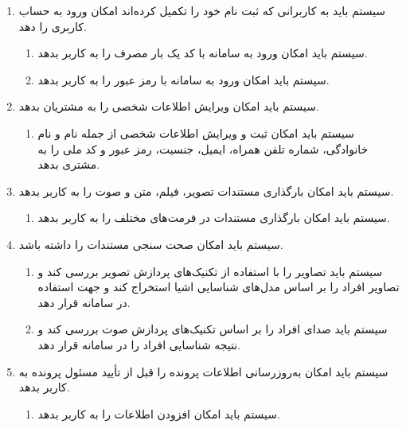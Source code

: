 \documentclass[12pt,a4paper,oneside]{article}
\begin{document}
\begin{itemize}
\begin{enumerate}
			\item 
			سیستم باید به کاربرانى که ثبت نام خود را تکمیل کرده‌اند امکان ورود به حساب کاربری را دهد.
			\begin{enumerate}
				\renewcommand{\labelenumii}{{\rl{\arabic{enumii}.\arabic{enumi}}}R-}
				\item 
				سیستم باید امکان ورود به سامانه با کد یک بار مصرف را به کاربر بدهد.
				\item 
				سیستم باید امکان ورود به سامانه با رمز عبور را به کاربر بدهد.
			\end{enumerate}
	
			\item 
			سیستم باید امکان ویرایش اطلاعات شخصى را به مشتریان بدهد.
			\begin{enumerate}
				\renewcommand{\labelenumii}{{\rl{\arabic{enumii}.\arabic{enumi}}}R-}
				\item 
				سیستم باید امکان ثبت و ویرایش اطلاعات شخصى از جمله نام و نام خانوادگی، شماره تلفن همراه، ایمیل، جنسیت، رمز عبور و کد ملى را به مشتری بدهد.
			\end{enumerate}
	
			\item 
			سیستم باید امکان بارگذاری مستندات تصویر، فیلم، متن و صوت را به کاربر بدهد.
			\begin{enumerate}
				\renewcommand{\labelenumii}{{\rl{\arabic{enumii}.\arabic{enumi}}}R-}
				\item 
				سیستم باید امکان بارگذاری مستندات در فرمت‌های مختلف را به کاربر بدهد.
			\end{enumerate}
	
			\item 
			سیستم باید امکان صحت سنجی مستندات را داشته باشد.
			\begin{enumerate}
				\renewcommand{\labelenumii}{{\rl{\arabic{enumii}.\arabic{enumi}}}R-}
				\item 
				سیستم باید تصاویر را با استفاده از تکنیک‌های پردازش تصویر بررسی کند و تصاویر افراد را بر اساس مدل‌های شناسایی اشیا استخراج کند و جهت استفاده در سامانه قرار دهد.
				\item 
				سیستم باید صدای افراد را بر اساس تکنیک‌های پردازش صوت بررسی کند و نتیجه شناسایی افراد را در سامانه قرار دهد.
			\end{enumerate}
	
			\item 
			سیستم باید امکان به‌روزرسانی اطلاعات پرونده را قبل از تأیید مسئول پرونده به کاربر بدهد.
			\begin{enumerate}
				\renewcommand{\labelenumii}{{\rl{\arabic{enumii}.\arabic{enumi}}}R-}
				\item 
				سیستم باید امکان افزودن اطلاعات را به کاربر بدهد.
			\end{enumerate}
	

\end{enumerate}
\end{itemize}
\end{document}
